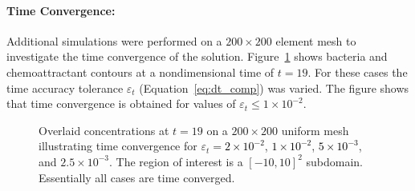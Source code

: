 \paragraph{Time Convergence:} Additional simulations were performed on a $200\times 200$ element mesh to investigate the time convergence of the solution. Figure~\ref{fig:radial_spots_time_convergence} shows bacteria and chemoattractant contours at a nondimensional time of $t=19$.  For these cases the time accuracy tolerance $\varepsilon_t$ (Equation~\eqref{eq:dt_comp}) was varied.  The figure shows that time convergence is obtained for values of $\varepsilon_t \le 1\times 10^{-2}$.

\begin{figure}[hbtp]
  \begin{center}
    \caption[Overlaid concentrations at $t=19$ on a $200\times 200$ uniform mesh illustrating time convergence]{Overlaid concentrations at $t=19$ on a $200\times 200$ uniform mesh illustrating time convergence for $\varepsilon_t=$\textcolor{black}{$2\times 10^{-2}$}, \textcolor{black}{$1\times 10^{-2}$}, \textcolor{black}{$5\times 10^{-3}$}, and $2.5\times 10^{-3}$.  The region of interest is a $[-10,10]^2$ subdomain.  Essentially all cases are time converged.\label{fig:radial_spots_time_convergence}}
  \end{center}
\end{figure}



